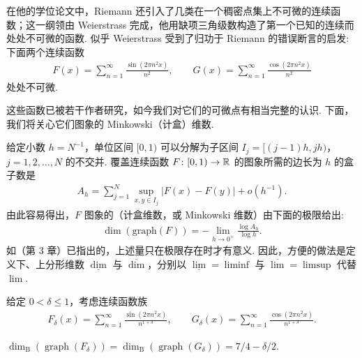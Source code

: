在他的学位论文中，Riemann 还引入了几类在一个稠密点集上不可微的连续函数；这一纲领由 Weierstrass 完成，他用缺项三角级数构造了第一个已知的连续而处处不可微的函数. 似乎 Weierstrass 受到了归功于 Riemann 的错误断言的启发: 下面两个连续函数
\begin{align*}
  F(x)=\sum_{n=1}^{\infty}\frac{\sin(2\pi n^{2}x)}{n^{2}},\qquad
  G(x)=\sum_{n=1}^{\infty}\frac{\cos(2\pi n^{2}x)}{n^{2}}
\end{align*}
处处不可微.

这些函数已被若干作者研究，如今我们对它们的可微点有相当完整的认识. 下面，我们将关心它们图象的 Minkowski（计盒）维数.

\begin{remark}\label{rem:8.10}
给定小数 $h = N^{-1}$，单位区间 $[0,1)$ 可以分解为子区间 $I_j = [(j-1)h, jh)$，$j = 1,2,\ldots,N$ 的不交并. 覆盖连续函数 $F\colon [0,1) \to \mathbb{R}$ 的图象所需的边长为 $h$ 的盒子数是
\begin{align*}
  A_{h}=\sum_{j=1}^{N}\sup_{x,y\in I_{j}}|F(x)-F(y)|+o(h^{-1}).
\end{align*}
由此容易得出，$F$ 图象的（计盒维数，或 Minkowski 维数）由下面的极限给出:
\begin{align*}
  \dim(\mathrm{graph}(F))=-\lim_{h\to 0^{+}}\frac{\log A_{h}}{\log h}.
\end{align*}
如（第 3 章）已指出的，上述量只在极限存在时才有意义. 因此，方便的做法是定义下、上分形维数 $\underline{\dim}$ 与 $\overline{\dim}$，分别以 $\underline{\lim} = \liminf$ 与 $\overline{\lim} = \limsup$ 代替 $\lim$.
\end{remark}

给定 $0 < \delta \leq 1$，考虑连续函数族
\begin{align*}
  F_{\delta}(x)=\sum_{n=1}^{\infty}\frac{\sin(2\pi n^{2}x)}{n^{1+\delta}},\qquad
  G_{\delta}(x)=\sum_{n=1}^{\infty}\frac{\cos(2\pi n^{2}x)}{n^{1+\delta}}.
\end{align*}

\begin{theorem}[{[\cite{b176}]}]\label{thm:8.11}
$\dim_{\mathrm{B}}(\operatorname{graph}(F_{\delta})) = \dim_{\mathrm{B}}(\operatorname{graph}(G_{\delta})) = 7/4 - \delta/2$.
\end{theorem}

